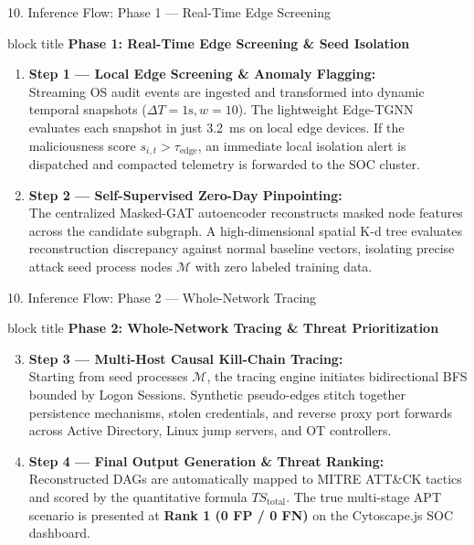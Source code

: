 \documentclass[aspectratio=169,10pt]{beamer}
\begin{document}
\begin{frame}{10. Inference Flow: Phase 1 — Real-Time Edge Screening}
\vspace{0.3em}
\begin{beamercolorbox}[rounded=true,shadow=false,sep=0.45em,wd=\textwidth]{block title}
\textbf{\scriptsize Phase 1: Real-Time Edge Screening \& Seed Isolation}
\end{beamercolorbox}
\vspace{0.3em}
{\fontsize{8.0pt}{11.5pt}\selectfont
\begin{enumerate}\itemsep0.60em
  \item \textbf{Step 1 — Local Edge Screening \& Anomaly Flagging:}\\
  Streaming OS audit events are ingested and transformed into dynamic temporal snapshots ($\Delta T=1\text{s}, w=10$). The lightweight Edge-TGNN evaluates each snapshot in just 3.2~ms on local edge devices. If the maliciousness score $s_{i,t} > \tau_{\text{edge}}$, an immediate local isolation alert is dispatched and compacted telemetry is forwarded to the SOC cluster.
  \item \textbf{Step 2 — Self-Supervised Zero-Day Pinpointing:}\\
  The centralized Masked-GAT autoencoder reconstructs masked node features across the candidate subgraph. A high-dimensional spatial K-d tree evaluates reconstruction discrepancy against normal baseline vectors, isolating precise attack seed process nodes $\mathcal{M}$ with zero labeled training data.
\end{enumerate}
}
\end{frame}

\begin{frame}{10. Inference Flow: Phase 2 — Whole-Network Tracing}
\vspace{0.3em}
\begin{beamercolorbox}[rounded=true,shadow=false,sep=0.45em,wd=\textwidth]{block title}
\textbf{\scriptsize Phase 2: Whole-Network Tracing \& Threat Prioritization}
\end{beamercolorbox}
\vspace{0.3em}
{\fontsize{8.0pt}{11.5pt}\selectfont
\begin{enumerate}\setcounter{enumi}{2}\itemsep0.60em
  \item \textbf{Step 3 — Multi-Host Causal Kill-Chain Tracing:}\\
  Starting from seed processes $\mathcal{M}$, the tracing engine initiates bidirectional BFS bounded by Logon Sessions. Synthetic pseudo-edges stitch together persistence mechanisms, stolen credentials, and reverse proxy port forwards across Active Directory, Linux jump servers, and OT controllers.
  \item \textbf{Step 4 — Final Output Generation \& Threat Ranking:}\\
  Reconstructed DAGs are automatically mapped to MITRE ATT\&CK tactics and scored by the quantitative formula $TS_{\text{total}}$. The true multi-stage APT scenario is presented at \textbf{Rank 1 (0 FP / 0 FN)} on the Cytoscape.js SOC dashboard.
\end{enumerate}
}
\end{frame}
\end{document}
